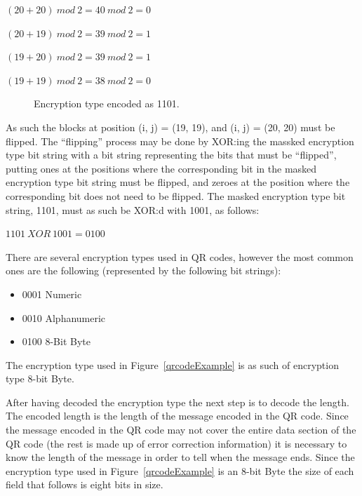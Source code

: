 \begin{center}

\((20+20)~mod~2=40~mod~2=0\)

\((20+19)~mod~2=39~mod~2=1\)

\((19+20)~mod~2=39~mod~2=1\)

\((19+19)~mod~2=38~mod~2=0\)

\end{center}

	\begin{figure}[H]%
		\centering
		\caption{Encryption type encoded as 1101.}
		\label{qrcodeExampleStep4}
	\end{figure}

As such the blocks at position (i, j) = (19, 19), and (i, j) = (20, 20) must be flipped. The ``flipping'' process may be done by XOR:ing the massked encryption type bit string with a bit string representing the bits that must be ``flipped'', putting ones at the positions where the corresponding bit in the masked encryption type bit string must be flipped, and zeroes at the position where the corresponding bit does not need to be flipped. The masked encryption type bit string, 1101, must as such be XOR:d with 1001, as follows:

\begin{center}
\(1101~XOR~1001=0100\)
\end{center}

There are several encryption types used in QR codes, however the most common ones are the following (represented by the following bit strings):

\begin{itemize}
	\item 0001 Numeric
	\item 0010 Alphanumeric
	\item 0100 8-Bit Byte
\end{itemize}

The encryption type used in Figure~\ref{qrcodeExample} is as such of encryption type 8-bit Byte.

After having decoded the encryption type the next step is to decode the length. The encoded length is the length of the message encoded in the QR code. Since the message encoded in the QR code may not cover the entire data section of the QR code (the rest is made up of error correction information) it is necessary to know the length of the message in order to tell when the message ends. Since the encryption type used in Figure~\ref{qrcodeExample} is an 8-bit Byte the size of each field that follows is eight bits in size.

